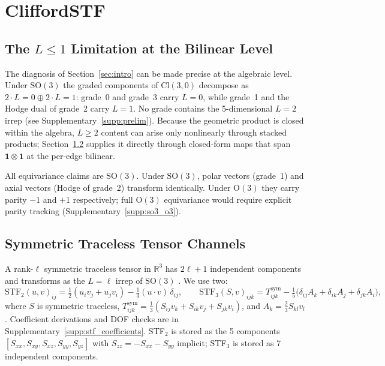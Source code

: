 \section{CliffordSTF}\label{sec:method}

\subsection{The \texorpdfstring{$L \leq 1$}{L <= 1} Limitation at the Bilinear Level}\label{sec:limitation}

The diagnosis of Section~\ref{sec:intro} can be made precise at the algebraic level. Under $\mathrm{SO}(3)$ the graded components of $\mathrm{Cl}(3,0)$ decompose as $2\cdot L{=}0 \oplus 2\cdot L{=}1$: grade~0 and grade~3 carry $L{=}0$, while grade~1 and the Hodge dual of grade~2 carry $L{=}1$. No grade contains the 5-dimensional $L{=}2$ irrep \citep{doran2003geometric,lounesto2001clifford} (see Supplementary~\ref{supp:prelim}). Because the geometric product is closed within the algebra, $L \geq 2$ content can arise only nonlinearly through stacked products; Section~\ref{sec:stf_channels} supplies it directly through closed-form maps that span $\mathbf{1}\otimes\mathbf{1}$ at the per-edge bilinear.

\begin{remark}\label{rem:so3_vs_o3}
All equivariance claims are $\mathrm{SO}(3)$. Under $\mathrm{SO}(3)$, polar vectors (grade~1) and axial vectors (Hodge of grade~2) transform identically. Under $\mathrm{O}(3)$ they carry parity $-1$ and $+1$ respectively; full $\mathrm{O}(3)$ equivariance would require explicit parity tracking (Supplementary~\ref{supp:so3_o3}).
\end{remark}

\subsection{Symmetric Traceless Tensor Channels}\label{sec:stf_channels}

A rank-$\ell$ symmetric traceless tensor in $\mathbb{R}^3$ has $2\ell+1$ independent components and transforms as the $L{=}\ell$ irrep of $\mathrm{SO}(3)$ \citep{coope1965irreducible,applequist1989traceless,stone2013theory,shao2025orthonormal}. We use two:
\[
\mathrm{STF}_2(u,v)_{ij} = \tfrac{1}{2}(u_iv_j + u_jv_i) - \tfrac{1}{3}(u \cdot v)\,\delta_{ij}, \qquad
\mathrm{STF}_3(S,v)_{ijk} = T^{\text{sym}}_{ijk} - \tfrac{1}{5}\bigl(\delta_{ij}A_k + \delta_{ik}A_j + \delta_{jk}A_i\bigr),
\]
where $S$ is symmetric traceless, $T^{\text{sym}}_{ijk} = \tfrac{1}{3}(S_{ij}v_k + S_{ik}v_j + S_{jk}v_i)$, and $A_k = \tfrac{2}{3}S_{kl}v_l$. Coefficient derivations and DOF checks are in Supplementary~\ref{supp:stf_coefficients}. STF$_2$ is stored as the 5 components $[S_{xx}, S_{xy}, S_{xz}, S_{yy}, S_{yz}]$ with $S_{zz}=-S_{xx}-S_{yy}$ implicit; STF$_3$ is stored as 7 independent components.


